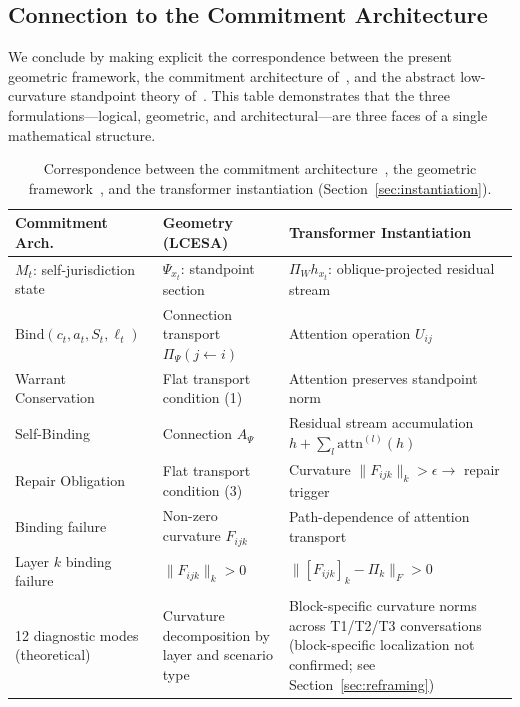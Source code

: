 \subsection{Connection to the Commitment Architecture}
\label{sec:correspondence}

We conclude by making explicit the correspondence between the present geometric
framework, the commitment architecture of~\cite{self-jurisdiction}, and the abstract
low-curvature standpoint theory of~\cite{LCESA}. This table demonstrates that the
three formulations---logical, geometric, and architectural---are three faces of a single
mathematical structure.

\begin{table}[h]
\centering
\caption{Correspondence between the commitment architecture~\cite{self-jurisdiction},
the geometric framework~\cite{LCESA}, and the transformer instantiation
(Section~\ref{sec:instantiation}).}
\label{tab:correspondence}
\begin{tabular}{@{}p{3.8cm}p{4.2cm}p{5.2cm}@{}}
\toprule
\textbf{Commitment Arch.} & \textbf{Geometry (LCESA)} & \textbf{Transformer Instantiation} \\
\midrule
$M_t$: self-jurisdiction state &
$\Psi_{x_t}$: standpoint section &
$\Pi_W h_{x_t}$: oblique-projected residual stream \\[4pt]
$\mathrm{Bind}(c_t, a_t, S_t, \ell_t)$ &
Connection transport $\Pi_\Psi(j \leftarrow i)$ &
Attention operation $U_{ij}$ \\[4pt]
Warrant Conservation &
Flat transport condition (1) &
Attention preserves standpoint norm \\[4pt]
Self-Binding &
Connection $A_\Psi$ &
Residual stream accumulation $h + \sum_l \mathrm{attn}^{(l)}(h)$ \\[4pt]
Repair Obligation &
Flat transport condition (3) &
Curvature $\|F_{ijk}\|_k > \epsilon \to$ repair trigger \\[4pt]
Binding failure &
Non-zero curvature $F_{ijk}$ &
Path-dependence of attention transport \\[4pt]
Layer $k$ binding failure &
$\|F_{ijk}\|_k > 0$ &
$\|[F_{ijk}]_k - \Pi_k\|_F > 0$ \\[4pt]
12 diagnostic modes (theoretical) &
Curvature decomposition by layer and scenario type &
Block-specific curvature norms across T1/T2/T3 conversations (block-specific localization not confirmed; see Section~\ref{sec:reframing}) \\
\bottomrule
\end{tabular}
\end{table}

